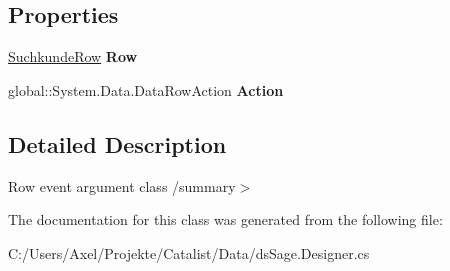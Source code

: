 \subsection*{Properties}
\begin{DoxyCompactItemize}
\item 
\hyperlink{class_products_1_1_data_1_1ds_sage_1_1_suchkunde_row}{Suchkunde\+Row} {\bfseries Row}\hypertarget{class_products_1_1_data_1_1ds_sage_1_1_suchkunde_row_change_event_a0f36c7663b853861245fe016e1806d2a}{}\label{class_products_1_1_data_1_1ds_sage_1_1_suchkunde_row_change_event_a0f36c7663b853861245fe016e1806d2a}

\item 
global\+::\+System.\+Data.\+Data\+Row\+Action {\bfseries Action}\hypertarget{class_products_1_1_data_1_1ds_sage_1_1_suchkunde_row_change_event_a47fe2d9937a5f770a637f7f3278c0ddf}{}\label{class_products_1_1_data_1_1ds_sage_1_1_suchkunde_row_change_event_a47fe2d9937a5f770a637f7f3278c0ddf}

\end{DoxyCompactItemize}


\subsection{Detailed Description}
Row event argument class /summary$>$ 

The documentation for this class was generated from the following file\+:\begin{DoxyCompactItemize}
\item 
C\+:/\+Users/\+Axel/\+Projekte/\+Catalist/\+Data/ds\+Sage.\+Designer.\+cs\end{DoxyCompactItemize}
